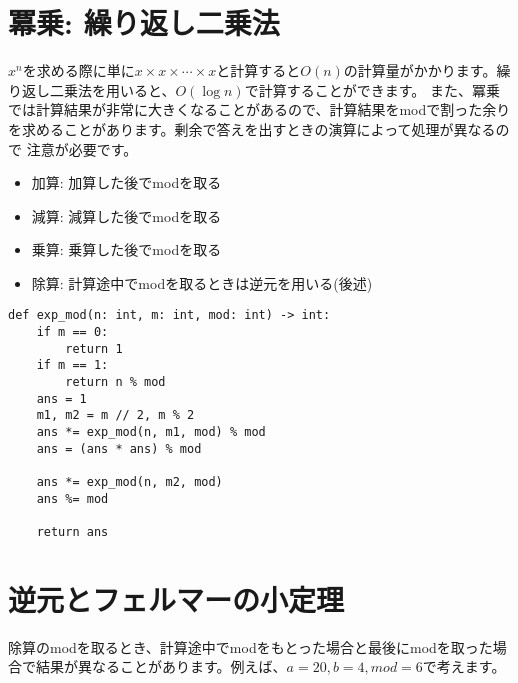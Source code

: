 \documentclass{jlreq}
\begin{document}
\section{冪乗: 繰り返し二乗法}

$x^n$を求める際に単に$x \times x \times \cdots \times x$と計算すると$O(n)$の計算量がかかります。繰り返し二乗法を用いると、$O(\log n)$で計算することができます。
また、冪乗では計算結果が非常に大きくなることがあるので、計算結果をmodで割った余りを求めることがあります。剰余で答えを出すときの演算によって処理が異なるので
注意が必要です。

\begin{itemize}
    \item 加算: 加算した後でmodを取る
    \item 減算: 減算した後でmodを取る
    \item 乗算: 乗算した後でmodを取る
    \item 除算: 計算途中でmodを取るときは逆元を用いる(後述)
\end{itemize}

\begin{lstlisting}[caption=繰り返し二乗法の実装, label=power, frame=TRBL]
def exp_mod(n: int, m: int, mod: int) -> int:
    if m == 0:
        return 1
    if m == 1:
        return n % mod
    ans = 1
    m1, m2 = m // 2, m % 2
    ans *= exp_mod(n, m1, mod) % mod
    ans = (ans * ans) % mod
    
    ans *= exp_mod(n, m2, mod)
    ans %= mod
    
    return ans
\end{lstlisting}

\section{逆元とフェルマーの小定理}

除算のmodを取るとき、計算途中でmodをもとった場合と最後にmodを取った場合で結果が異なることがあります。例えば、$a = 20, b = 4, mod = 6$で考えます。
\end{document}
